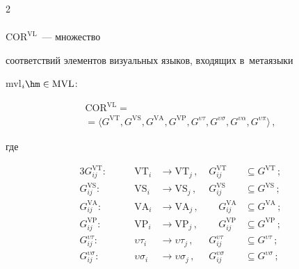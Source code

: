 \begin{multicols}{2}
\begin{gather*}
  \end{gather*}


  $\mathrm{COR}^{\mathrm{VL}}$~--- множество 


соответствий элементов визуальных языков, входящих в~метаязыки 


mvl$_i\hm\in \mathrm{MVL}$:


\begin{multline*}


  \mathrm{COR}^{\mathrm{VL}} ={}\\


  {}=\langle G^{\mathrm{VT}}, G^{\mathrm{VS}}, G^{\mathrm{VA}}, 


  G^{\mathrm{VP}}, G^{\upsilon\tau}, 


G^{\upsilon\sigma}, G^{\upsilon\alpha}, G^{\upsilon\pi}\rangle\,,


\end{multline*}


  где


\begin{alignat*}{3}


  G^{\mathrm{VT}}_{ij}:\ & \quad&\mathrm{VT}_i&\to \mathrm{VT}_j\,,\ &


  G^{\mathrm{VT}}_{ij}&\subseteq G^{\mathrm{VT}}\,;\\


  G_{ij}^{\mathrm{VS}}:\ & &\mathrm{VS}_i&\to \mathrm{VS}_j\,,\ &G_{ij}^{\mathrm{VS}}


 & \subseteq G^{\mathrm{VS}}\,;\\


  G_{ij}^{\mathrm{VA}}:\ &&\mathrm{VA}_i&\to \mathrm{VA}_j\,,\ &\quad G_{ij}^{\mathrm{VA}}


  &\subseteq G^{\mathrm{VA}}\,;\\


  G_{ij}^{\mathrm{VP}}:\ &&\mathrm{VP}_i&\to \mathrm{VP}_j\,,\ &\quad G_{ij}^{\mathrm{VP}}


  &\subseteq G^{\mathrm{VP}}\,;\\


  G_{ij}^{\upsilon\tau}:\ &&\upsilon\tau_i&\to \upsilon\tau_j\,,\ 


&G^{\upsilon\tau}_{ij}&\subseteq G^{\upsilon\tau}\,;\\


  G_{ij}^{\upsilon\sigma}:\ &&\upsilon\sigma_i&\to \upsilon\sigma_j\,,\ 


&G_{ij}^{\upsilon\sigma}&\subseteq G^{\upsilon\sigma}\,;\\



\end{alignat*}
\end{multicols}

